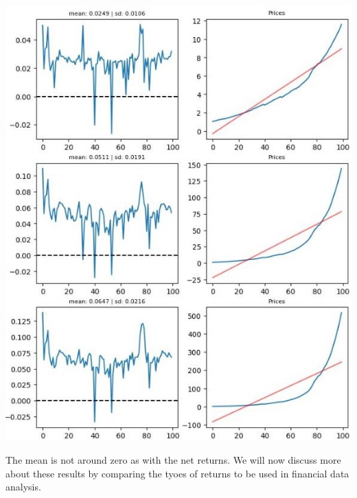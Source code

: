 \documentclass{article}
\begin{document}
\begin{multicols}{2}
    \begin{center}
        \includegraphics[scale = 0.5]{imgs/elisa/log.jpg}
    \end{center}

    The mean is not around zero as with the net returns. We will now discuss more about these results by comparing the tyoes of returns to be used in financial data analysis.\\


\end{multicols}
\end{document}

